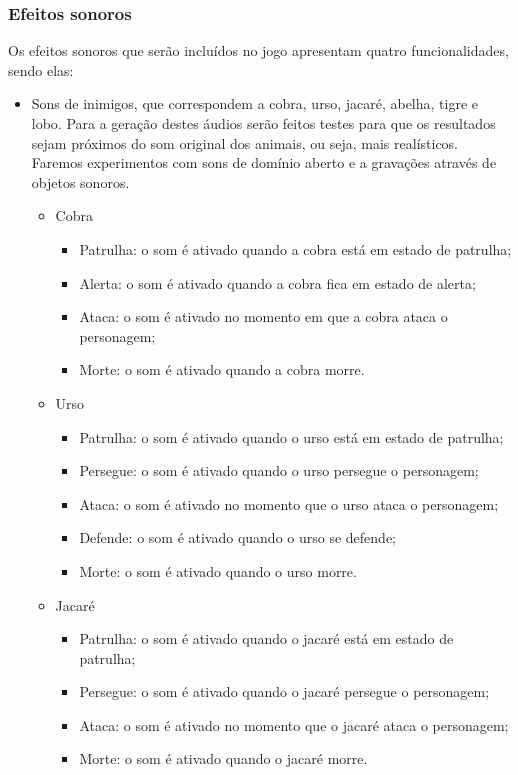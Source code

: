 \subsubsection{Efeitos sonoros}
Os efeitos sonoros que serão incluídos no jogo apresentam quatro funcionalidades, sendo elas:
\begin{itemize}
\item Sons de inimigos, que correspondem a cobra, urso, jacaré, abelha, tigre e lobo. Para a geração destes áudios serão feitos testes para que os resultados sejam próximos do som original dos animais, ou seja, mais realísticos. Faremos experimentos com sons de domínio aberto e a gravações através de objetos sonoros. 

\begin{itemize}
\item Cobra
\begin{itemize}
\item Patrulha: o som é ativado quando a cobra está em estado de patrulha;
\item Alerta: o som é ativado quando a cobra fica em estado de alerta;
\item Ataca: o som é ativado no momento em que a cobra ataca 
o personagem;
\item Morte: o som é ativado quando a cobra morre. 
\end{itemize}

\item Urso
\begin{itemize}
\item Patrulha: o som é ativado quando o urso está em estado de patrulha;
\item Persegue: o som é ativado quando o urso persegue o personagem;
\item Ataca: o som é ativado no momento que o urso ataca o personagem;
\item Defende: o som é ativado quando o urso se defende;
\item Morte: o som é ativado quando o urso morre.
\end{itemize}

\item Jacaré
\begin{itemize}
\item Patrulha: o som é ativado quando o jacaré está em estado de patrulha;
\item Persegue: o som é ativado quando o jacaré persegue o personagem;
\item Ataca: o som é ativado no momento que o jacaré ataca o personagem;
\item Morte: o som é ativado quando o jacaré morre.
\end{itemize}


\end{itemize}
\end{itemize}
